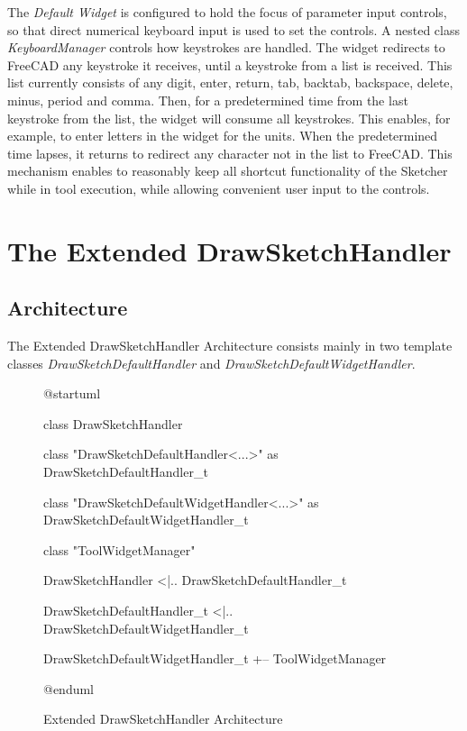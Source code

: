 \documentclass[12pt,twoside,a4paper]{book}
\newcommand{\DefaultWidget}{\emph{Default Widget}}
\newcommand{\DrawSketchDefaultHandler}{\emph{DrawSketchDefaultHandler}}
\newcommand{\DrawSketchDefaultWidgetHandler}{\emph{DrawSketchDefaultWidgetHandler}}
\begin{document}
    The \DefaultWidget{} is configured to hold the focus of parameter input controls, so that direct numerical keyboard input is used to set the controls. A nested class \emph{KeyboardManager} controls how keystrokes are handled. The widget redirects to FreeCAD any keystroke it receives, until a keystroke from a list is received. This list currently consists of any digit, enter, return, tab, backtab, backspace, delete, minus, period and comma. Then, for a predetermined time from the last keystroke from the list, the widget will consume all keystrokes. This enables, for example, to enter letters in the widget for the units. When the predetermined time lapses, it returns to redirect any character not in the list to FreeCAD. This mechanism enables to reasonably keep all shortcut functionality of the Sketcher while in tool execution, while allowing convenient user input to the controls.

    \chapter{The Extended DrawSketchHandler}

    \section{Architecture}

    The Extended DrawSketchHandler Architecture consists mainly in two template classes \DrawSketchDefaultHandler{} and \DrawSketchDefaultWidgetHandler{}.

 \begin{figure}
    \centering
    \caption{Extended DrawSketchHandler Architecture}
        \begin{plantuml}
        @startuml

        class DrawSketchHandler{
        }

        class "DrawSketchDefaultHandler<...>" as DrawSketchDefaultHandler_t

        class "DrawSketchDefaultWidgetHandler<...>" as DrawSketchDefaultWidgetHandler_t

        class "ToolWidgetManager"

        DrawSketchHandler <|.. DrawSketchDefaultHandler_t

        DrawSketchDefaultHandler_t <|.. DrawSketchDefaultWidgetHandler_t

        DrawSketchDefaultWidgetHandler_t +-- ToolWidgetManager

        @enduml
        \end{plantuml}
    \end{figure}
\end{document}
